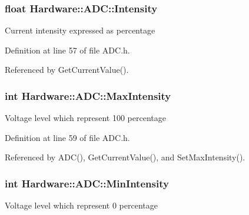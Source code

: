 \hypertarget{class_hardware_1_1_a_d_c_a38a0f00558a3de01b3bce567643dae4a}{}
\subsubsection[{Intensity}]{\setlength{\rightskip}{0pt plus 5cm}float Hardware\+::\+A\+D\+C\+::\+Intensity\hspace{0.3cm}{\ttfamily [private]}}\label{class_hardware_1_1_a_d_c_a38a0f00558a3de01b3bce567643dae4a}
Current intensity expressed as percentage 

Definition at line 57 of file A\+D\+C.\+h.



Referenced by Get\+Current\+Value().

\hypertarget{class_hardware_1_1_a_d_c_a8fb4ac4b41ff54a44e57e9ce8bc5bd93}{}
\subsubsection[{Max\+Intensity}]{\setlength{\rightskip}{0pt plus 5cm}int Hardware\+::\+A\+D\+C\+::\+Max\+Intensity\hspace{0.3cm}{\ttfamily [private]}}\label{class_hardware_1_1_a_d_c_a8fb4ac4b41ff54a44e57e9ce8bc5bd93}
Voltage level which represent 100 percentage 

Definition at line 59 of file A\+D\+C.\+h.



Referenced by A\+D\+C(), Get\+Current\+Value(), and Set\+Max\+Intensity().

\hypertarget{class_hardware_1_1_a_d_c_af73224014dddfdd80f77b80e6ed82c13}{}
\subsubsection[{Min\+Intensity}]{\setlength{\rightskip}{0pt plus 5cm}int Hardware\+::\+A\+D\+C\+::\+Min\+Intensity\hspace{0.3cm}{\ttfamily [private]}}\label{class_hardware_1_1_a_d_c_af73224014dddfdd80f77b80e6ed82c13}
Voltage level which represent 0 percentage 

